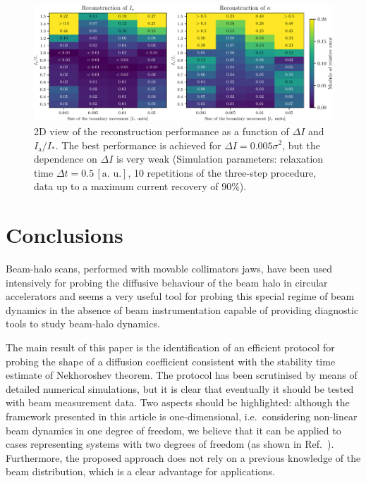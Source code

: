 \begin{figure}[htp]
    \centering
    \includegraphics[width=\textwidth]{4_probing_the_diffusive_behavior/figs/final/MULTI_different_step_size.pdf}
    \caption{2D view of the reconstruction performance as a function of $\Delta I$ and $I_\mathrm{a}/I_\ast$. The  best performance is achieved for $\Delta I = 0.005 \sigma^2$, but the dependence on $\Delta I$ is very weak (Simulation parameters: relaxation time $\Delta t=0.5 \, [\text{a. u.}]$, 10 repetitions of the three-step procedure, data up to a maximum current recovery of $90\%$).}
    \label{fig:different_movement_module}
\end{figure}


\section{Conclusions}
\label{sec:conclusions}


Beam-halo scans, performed with movable collimators jaws, have been used intensively for probing the diffusive behaviour of the beam halo in circular accelerators and seems a very useful tool for probing this special regime of beam dynamics in the absence of beam instrumentation capable of providing diagnostic tools to study beam-halo dynamics.

{The main result of this paper} is the identification of an efficient protocol for probing the shape of {a diffusion coefficient consistent with the stability time estimate of Nekhoroshev theorem}. The protocol has been scrutinised by means of detailed numerical simulations, {but} it is clear that eventually it should be tested with beam measurement data. Two aspects should be highlighted: although the framework presented in this article is one-dimensional, i.e.\ considering non-linear beam dynamics in one degree of freedom, we believe that it can be applied to cases representing systems with two degrees of freedom (as shown in Ref.~\cite{bazzani2020diffusion}). Furthermore, the proposed approach does not rely on a previous knowledge of the beam distribution, which is a clear advantage for applications. 
 
